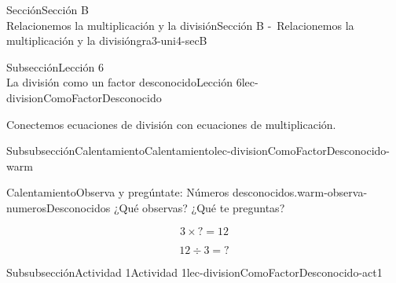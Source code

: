 \begin{sectionptx}{Sección}{{\Large Sección B\\}Relacionemos la multiplicación y la división}{}{Sección B -~Relacionemos la multiplicación y la división}{}{}{gra3-uni4-secB}
\vspace*{-2ex}
%
%
\typeout{************************************************}
\typeout{************************************************}
%
\begin{subsectionptx}{Subsección}{{\normalsize Lección 6\\[-0.05cm]}La división como un factor desconocido}{}{Lección 6}{}{}{lec-divisionComoFactorDesconocido}
\begin{introduction}{}%
Conectemos ecuaciones de división con ecuaciones de multiplicación.%
\end{introduction}%
%
%
\typeout{************************************************}
\typeout{************************************************}
%
\vspace*{-1.5ex}
\begin{subsubsectionptx}{Subsubsección}{Calentamiento}{}{Calentamiento}{}{}{lec-divisionComoFactorDesconocido-warm}
\begin{exploration}{Calentamiento}{Observa y pregúntate: Números desconocidos.}{warm-observa-numerosDesconocidos}%
¿Qué observas? ¿Qué te preguntas?%
\vspace*{-1.5ex}
\begin{sidebyside}{2}{0}{0}{0}%
\begin{sbspanel}{0.5}%
%
\begin{equation*}
3\times {?} =12
\end{equation*}
%
\end{sbspanel}%
\begin{sbspanel}{0.5}%
\par
%
\begin{equation*}
12\div 3 ={?}
\end{equation*}
%
\end{sbspanel}%
\end{sidebyside}%
\end{exploration}%
\end{subsubsectionptx}
%
%
\typeout{************************************************}
\typeout{************************************************}
%
\vspace*{-1.5ex}
\begin{subsubsectionptx}{Subsubsección}{Actividad 1}{}{Actividad 1}{}{}{lec-divisionComoFactorDesconocido-act1}

\end{subsubsectionptx}
\end{subsectionptx}
\end{sectionptx}
